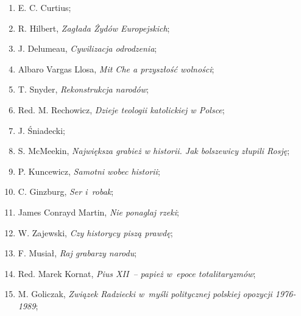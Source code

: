 \documentclass[a4paper,11pt]{article}
\begin{document}
\begin{enumerate}
\item E. C. Curtius;



\item R. Hilbert, \textit{Zagłada Żydów Europejskich};



\item J. Delumeau, \textit{Cywilizacja odrodzenia};



\item Albaro Vargas Llosa, \textit{Mit Che a przyszłość wolności};



\item T. Snyder, \textit{Rekonstrukcja narodów};



\item Red. M. Rechowicz, \textit{Dzieje teologii katolickiej w Polsce};



\item J. Śniadecki;



\item S. McMeekin, \textit{Największa grabież w historii. Jak bolszewicy
    złupili Rosję};



\item P. Kuncewicz, \textit{Samotni wobec historii};



\item C. Ginzburg, \textit{Ser i~robak};



\item James Conrayd Martin, \textit{Nie ponaglaj rzeki};



\item W. Zajewski, \textit{Czy historycy piszą prawdę};



\item F. Musiał, \textit{Raj grabarzy narodu};



\item Red. Marek Kornat, \textit{Pius XII~-- papież w~epoce
    totalitaryzmów};



\item M. Goliczak, \textit{Związek Radziecki w~myśli politycznej
    polskiej opozycji 1976-1989};




\end{enumerate}
\end{document}
